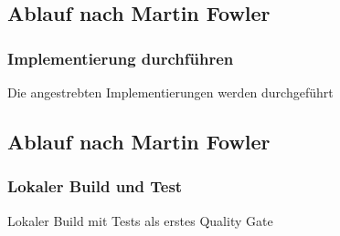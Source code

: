 \documentclass[hyperref={pdfpagelabels=false}]{beamer}
\begin{document}
\subsection{Ablauf nach Martin Fowler}
\begin{frame} [t]
\frametitle{Implementierung durchführen}
\begin{figure}[h]
  \centering
\end{figure}
\vspace{0.5cm} 
Die angestrebten Implementierungen werden durchgeführt
\end{frame}

\subsection{Ablauf nach Martin Fowler}
\begin{frame} [t]
\frametitle{Lokaler Build und Test}
\begin{figure}[h]
  \centering
\end{figure}
\vspace{0.5cm} 
Lokaler Build mit Tests als erstes Quality Gate
\end{frame}
\end{document}
